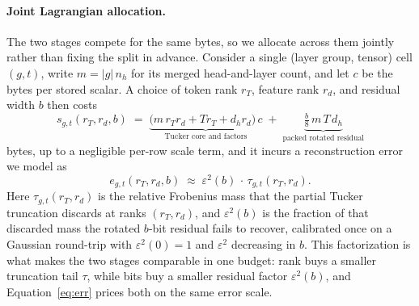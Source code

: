\documentclass{article}
\begin{document}
\paragraph{Joint Lagrangian allocation.} The two stages compete for the same bytes, so we allocate across them jointly rather than fixing the split in advance. Consider a single (layer group, tensor) cell $(g, t)$, write $m = |g|\, n_h$ for its merged head-and-layer count, and let $c$ be the bytes per stored scalar. A choice of token rank $r_T$, feature rank $r_d$, and residual width $b$ then costs
\begin{equation}
  s_{g,t}(r_T, r_d, b) \;=\; \underbrace{\big( m\, r_T r_d + T r_T + d_h r_d \big)\, c}_{\text{Tucker core and factors}} \;+\; \underbrace{\tfrac{b}{8}\, m\, T\, d_h}_{\text{packed rotated residual}}
  \label{eq:bytes}
\end{equation}
bytes, up to a negligible per-row scale term, and it incurs a reconstruction error we model as
\begin{equation}
  e_{g,t}(r_T, r_d, b) \;\approx\; \varepsilon^2(b)\,\cdot\,\tau_{g,t}(r_T, r_d) .
  \label{eq:err}
\end{equation}
Here $\tau_{g,t}(r_T, r_d)$ is the relative Frobenius mass that the partial Tucker truncation discards at ranks $(r_T, r_d)$, and $\varepsilon^2(b)$ is the fraction of that discarded mass the rotated $b$-bit residual fails to recover, calibrated once on a Gaussian round-trip with $\varepsilon^2(0){=}1$ and $\varepsilon^2$ decreasing in $b$. This factorization is what makes the two stages comparable in one budget: rank buys a smaller truncation tail $\tau$, while bits buy a smaller residual factor $\varepsilon^2(b)$, and Equation~\eqref{eq:err} prices both on the same error scale.
\end{document}
